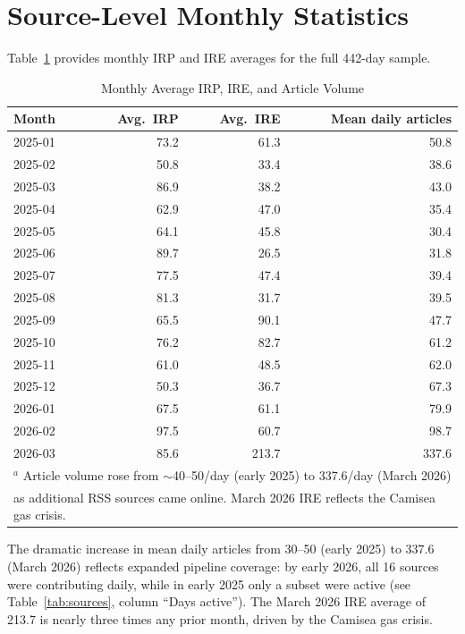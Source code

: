 \documentclass[12pt,a4paper]{article}
\begin{document}
\section{Source-Level Monthly Statistics}
\label{app:source_monthly}

Table~\ref{tab:sources_monthly} provides monthly IRP and IRE averages for
the full 442-day sample.

\begin{table}[h!]
\centering
\caption{Monthly Average IRP, IRE, and Article Volume}
\label{tab:sources_monthly}
\begin{tabular}{lrrr}
\toprule
Month & Avg.\ IRP & Avg.\ IRE & Mean daily articles \\
\midrule
2025-01 & 73.2 &  61.3 &  50.8 \\
2025-02 & 50.8 &  33.4 &  38.6 \\
2025-03 & 86.9 &  38.2 &  43.0 \\
2025-04 & 62.9 &  47.0 &  35.4 \\
2025-05 & 64.1 &  45.8 &  30.4 \\
2025-06 & 89.7 &  26.5 &  31.8 \\
2025-07 & 77.5 &  47.4 &  39.4 \\
2025-08 & 81.3 &  31.7 &  39.5 \\
2025-09 & 65.5 &  90.1 &  47.7 \\
2025-10 & 76.2 &  82.7 &  61.2 \\
2025-11 & 61.0 &  48.5 &  62.0 \\
2025-12 & 50.3 &  36.7 &  67.3 \\
2026-01 & 67.5 &  61.1 &  79.9 \\
2026-02 & 97.5 &  60.7 &  98.7 \\
2026-03 & 85.6 & 213.7 & 337.6 \\
\bottomrule
\multicolumn{4}{l}{\footnotesize $^a$ Article volume rose from $\sim$40--50/day (early 2025) to 337.6/day (March 2026)} \\
\multicolumn{4}{l}{\footnotesize as additional RSS sources came online. March 2026 IRE reflects the Camisea gas crisis.}
\end{tabular}
\end{table}

The dramatic increase in mean daily articles from 30--50 (early 2025) to
337.6 (March 2026) reflects expanded pipeline coverage: by early 2026,
all 16 sources were contributing daily, while in early 2025 only a subset
were active (see Table~\ref{tab:sources}, column ``Days active'').  The
March 2026 IRE average of 213.7 is nearly three times any prior month,
driven by the Camisea gas crisis.
\end{document}
